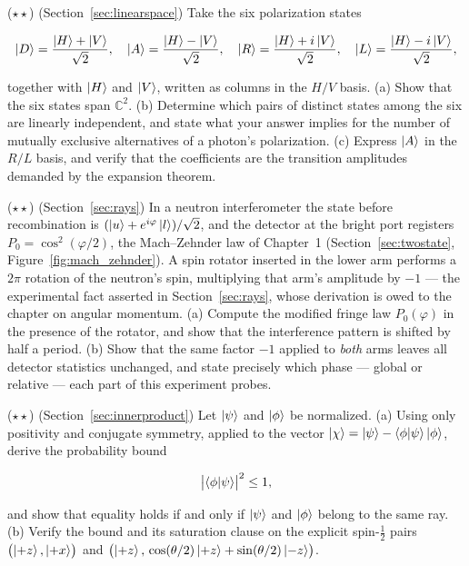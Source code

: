 \begin{problemset}
\item ($\star\star$) (Section~\ref{sec:linearspace}) Take the six polarization states
\begin{linenomath}
    \begin{equation}
        \ket{D}=\frac{\ket{H}+\ket{V}}{\sqrt{2}},\quad
        \ket{A}=\frac{\ket{H}-\ket{V}}{\sqrt{2}},\quad
        \ket{R}=\frac{\ket{H}+i\ket{V}}{\sqrt{2}},\quad
        \ket{L}=\frac{\ket{H}-i\ket{V}}{\sqrt{2}},
    \end{equation}
\end{linenomath}
together with $\ket{H}$ and $\ket{V}$, written as columns in the $H/V$ basis. (a) Show that the six states span $\mathbb{C}^2$. (b) Determine which pairs of distinct states among the six are linearly independent, and state what your answer implies for the number of mutually exclusive alternatives of a photon's polarization. (c) Express $\ket{A}$ in the $R/L$ basis, and verify that the coefficients are the transition amplitudes demanded by the expansion theorem.

\item ($\star\star$) (Section~\ref{sec:rays}) In a neutron interferometer the state before recombination is $(\ket{u}+e^{i\varphi}\ket{l})/\sqrt{2}$, and the detector at the bright port registers $P_0=\cos^2(\varphi/2)$, the Mach--Zehnder law of Chapter~1 (Section~\ref{sec:twostate}, Figure~\ref{fig:mach_zehnder}). A spin rotator inserted in the lower arm performs a $2\pi$ rotation of the neutron's spin, multiplying that arm's amplitude by $-1$ --- the experimental fact asserted in Section~\ref{sec:rays}, whose derivation is owed to the chapter on angular momentum. (a) Compute the modified fringe law $P_0(\varphi)$ in the presence of the rotator, and show that the interference pattern is shifted by half a period. (b) Show that the same factor $-1$ applied to \emph{both} arms leaves all detector statistics unchanged, and state precisely which phase --- global or relative --- each part of this experiment probes.

\item ($\star\star$) (Section~\ref{sec:innerproduct}) Let $\ket{\psi}$ and $\ket{\phi}$ be normalized. (a) Using only positivity and conjugate symmetry, applied to the vector $\ket{\chi}=\ket{\psi}-\braket{\phi|\psi}\ket{\phi}$, derive the probability bound
\begin{linenomath}
    \begin{equation}
        \bigl|\braket{\phi|\psi}\bigr|^2\leq 1,
    \end{equation}
\end{linenomath}
and show that equality holds if and only if $\ket{\psi}$ and $\ket{\phi}$ belong to the same ray. (b) Verify the bound and its saturation clause on the explicit spin-$\tfrac12$ pairs $\bigl(\ket{+z},\ket{+x}\bigr)$ and $\bigl(\ket{+z},\,\cos(\theta/2)\ket{+z}+\sin(\theta/2)\ket{-z}\bigr)$.


\end{problemset}
